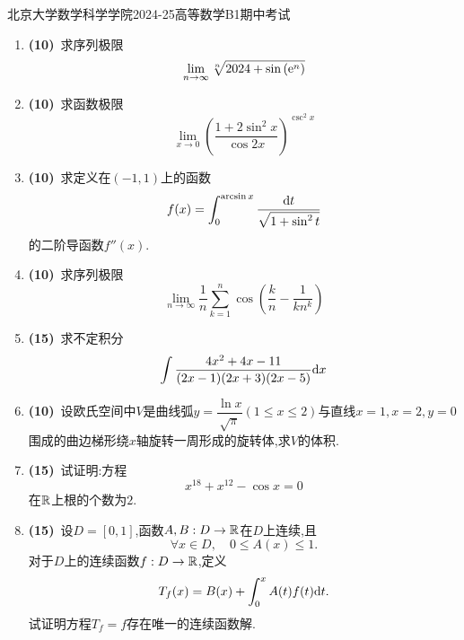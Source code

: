 \documentclass{ctexart}
\begin{document}
\pagestyle{empty}
\begin{center}\Large
    北京大学数学科学学院2024-25高等数学B1期中考试
\end{center}
\begin{enumerate}[leftmargin=*,label=\textbf{\arabic*.},topsep=0pt,parsep=0pt,itemsep=0pt,partopsep=0pt]
    \item \textbf{(10)}\ 求序列极限$$\lim_{n\to\infty}{\sqrt[n]{2024+\sin\left(\mathrm{e}^n\right)}}$$

    \item \textbf{(10)}\ 求函数极限$$\lim_{x\to0}\left(\dfrac{1+2\sin^2x}{\cos2x}\right)^{\csc^2x}$$

    \item \textbf{(10)}\ 求定义在$(-1,1)$上的函数$$f(x)=\int_0^{\arcsin x}\dfrac{\mathrm{d} t}{\sqrt{1+\sin^2t}}$$的二阶导函数$f''(x)$.

    \item \textbf{(10)}\ 求序列极限$$\lim_{n\to\infty}\dfrac{1}{n}\sum_{k=1}^{n}\cos\left(\dfrac{k}{n}-\dfrac{1}{kn^k}\right)$$

    \item \textbf{(15)}\ 求不定积分$$\int{\dfrac{4x^2+4x-11}{(2x-1)(2x+3)(2x-5)}\mathrm{d}x}$$

    \item \textbf{(10)}\ 设欧氏空间中$V$是曲线弧$\displaystyle y=\dfrac{\ln{x}}{\sqrt{\pi}}(1\leqslant x\leqslant 2)$与直线$x=1,x=2,y=0$围成的曲边梯形绕$x$轴旋转一周形成的旋转体,求$V$的体积.

    \item \textbf{(15)}\ 试证明:方程$$x^{18}+x^{12}-\cos x=0$$在$\mathbb{R}$上根的个数为$2$.

    \item \textbf{(15)}\ 设$D=[0,1]$,函数$A,B:D\to\mathbb{R}$在$D$上连续,且
    \[\forall x\in D,\quad0\leqslant A(x)\leqslant1.\]
    对于$D$上的连续函数$f:D\to\mathbb{R}$,定义
    \[T_f(x)=B(x)+\int_0^xA(t)f(t)\mathrm{d} t.\]
    试证明方程$T_f=f$存在唯一的连续函数解.
\end{enumerate}
\end{document}
